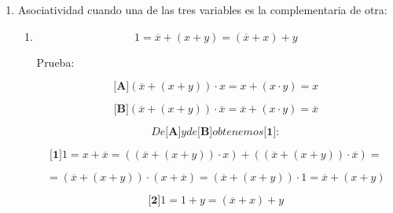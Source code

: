 \begin{enumerate}
\begin{enumerate}
\begin{enumerate}
\begin{enumerate}
\begin{enumerate}
          \[{\lbrack\mathbf{2}\rbrack}{{{({x \cdot {({x \cdot y})}})} + x} = x}\]

          \[\mathit{De}{\lbrack\mathbf{1}\rbrack}y\mathit{de}{\lbrack\mathbf{2}\rbrack}\mathit{obtenemos}:\]

          \[{{x \cdot y} = {{\lbrack{{({x \cdot {({x \cdot y})}})} + x}\rbrack} \cdot {\lbrack{{({x \cdot {({x \cdot y})}})} + y}\rbrack}}} =\]

          \[{{= {{({x \cdot {({x \cdot y})}})} + {({x \cdot y})}}} = {{({x \cdot {({x \cdot y})}})} + {({{({x \cdot y})} \cdot {({x \cdot y})}})}}} =\]

          \[{= {{({{({x \cdot {({x \cdot y})}})} + {({x \cdot y})}})} \cdot {({{({x \cdot {({x \cdot y})}})} + {({x \cdot y})}})}}} =\]

          \[= {x \cdot {({x \cdot y})}}\]

          \[{{{({x \cdot x})} \cdot y} = {x \cdot y}} = {x \cdot {({x \cdot y})}}\]
        \end{enumerate}
      \item
        Asociatividad cuando una de las tres variables es la
        complementaria de otra:

        \begin{enumerate}
        \def\labelenumv{\arabic{enumv}.}
        \item
          \[{1 = {\overline{x} + {({x + y})}}} = {{({\overline{x} + x})} + y}\]

          Prueba:

          \[{\lbrack\mathbf{A}\rbrack}{{{{({\overline{x} + {({x + y})}})} \cdot x} = {x + {({x \cdot y})}}} = x}\]

          \[{\lbrack\mathbf{B}\rbrack}{{{{({\overline{x} + {({x + y})}})} \cdot \overline{x}} = {\overline{x} + {({x \cdot y})}}} = \overline{x}}\]

          \[\mathit{De}{\lbrack\mathbf{A}\rbrack}y\mathit{de}{\lbrack\mathbf{B}\rbrack}\mathit{obtenemos}{\lbrack\mathbf{1}\rbrack}:\]

          \[{\lbrack\mathbf{1}\rbrack}{{{1 = {x + \overline{x}}} = {{({{({\overline{x} + {({x + y})}})} \cdot x})} + {({{({\overline{x} + {({x + y})}})} \cdot \overline{x}})}}} =}\]

          \[{{= {{({\overline{x} + {({x + y})}})} \cdot {({x + \overline{x}})}}} = {{({\overline{x} + {({x + y})}})} \cdot 1}} = {\overline{x} + {({x + y})}}\]

          \[{\lbrack\mathbf{2}\rbrack}{{1 = {1 + y}} = {{({\overline{x} + x})} + y}}\]


\end{enumerate}
\end{enumerate}
\end{enumerate}
\end{enumerate}
\end{enumerate}
